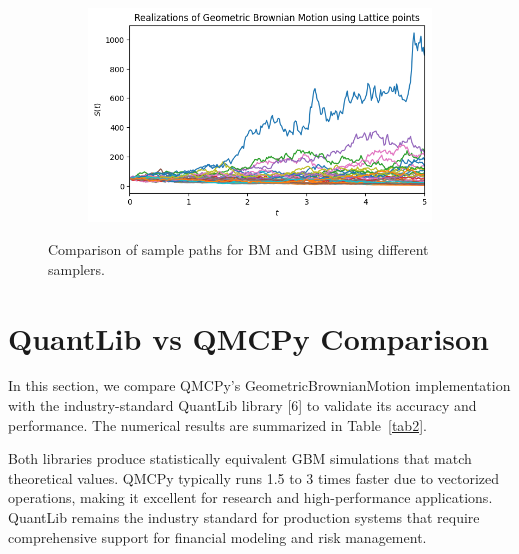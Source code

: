 \documentclass{article}
\begin{document}
\begin{figure}[tbp]
\begin{subfigure}[b]{0.49\textwidth}
\caption{}
\label{fig:bm_lattice}
\end{subfigure}
\hfill
\begin{subfigure}[b]{0.49\textwidth}
\includegraphics[width=\textwidth]{images/figure_4.png}
\caption{}
\label{fig:gbm_lattice}
\end{subfigure}
\caption{Comparison of sample paths for BM and GBM using different samplers.}
\label{fig:bm_gbm_paths}
\end{figure}

\section{QuantLib vs QMCPy Comparison}

In this section, we compare QMCPy's GeometricBrownianMotion implementation with the industry-standard QuantLib library [6] to validate its accuracy and performance. %
The numerical results are summarized in Table~\ref{tab2}. 

Both libraries produce statistically equivalent GBM simulations that match theoretical values. QMCPy typically runs 1.5 to 3 times faster due to vectorized operations, making it excellent for research and high-performance applications. QuantLib remains the industry standard for production systems that require comprehensive support for financial modeling and risk management.

\end{document}
